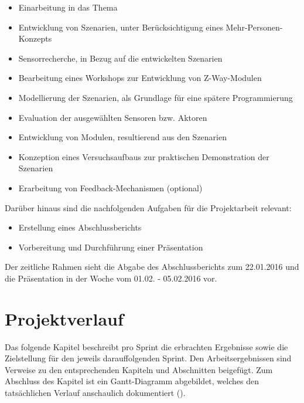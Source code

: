 \documentclass[12pt, oneside, smallheadings]{scrbook}
\begin{document}
\begin{itemize}
\item Einarbeitung in das Thema
\item Entwicklung von Szenarien, unter Berücksichtigung eines Mehr-Personen-Konzepts
\item Sensorrecherche, in Bezug auf die entwickelten Szenarien
\item Bearbeitung eines Workshops zur Entwicklung von Z-Way-Modulen
\item Modellierung der Szenarien, als Grundlage für eine spätere Programmierung
\item Evaluation der ausgewählten Sensoren bzw. Aktoren
\item Entwicklung von Modulen, resultierend aus den Szenarien
\item Konzeption eines Versuchsaufbaus zur praktischen Demonstration der Szenarien
\item Erarbeitung von Feedback-Mechanismen (optional)\\
\end{itemize}
\noindent
Darüber hinaus sind die nachfolgenden Aufgaben für die Projektarbeit relevant:\\

\begin{itemize}
\item Erstellung eines Abschlussberichts
\item Vorbereitung und Durchführung einer Präsentation\\
\end{itemize}
\noindent
Der zeitliche Rahmen sieht die Abgabe des Abschlussberichts zum 22.01.2016 und die Präsentation in der Woche vom 01.02. - 05.02.2016 vor.

\chapter{Projektverlauf}

Das folgende Kapitel beschreibt pro Sprint die erbrachten Ergebnisse sowie die Zielstellung für den jeweils darauffolgenden Sprint. Den Arbeitsergebnissen sind Verweise zu den entsprechenden Kapiteln und Abschnitten beigefügt. Zum Abschluss des Kapitel ist ein Gantt-Diagramm abgebildet, welches den tatsächlichen Verlauf anschaulich dokumentiert ().
\end{document}
